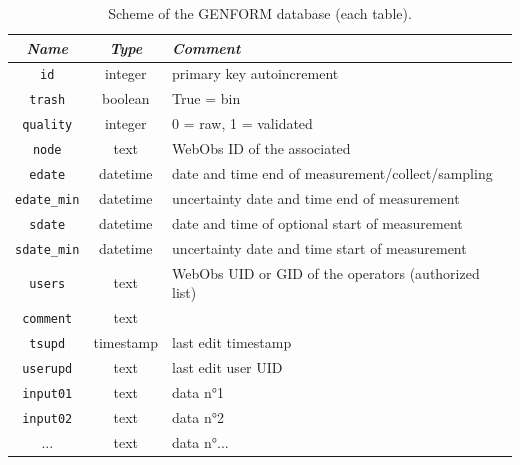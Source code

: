 \begin{table}[h]
	\centering
	\begin{tabular}{c c l}
		\hline
		\textit{Name} & \textit{Type} & \textit{Comment} \\
		\hline
		{\tt id}         & integer  & primary key autoincrement\\
		{\tt trash}      & boolean  & True = bin	\\
		{\tt quality}    & integer  & 0 = raw, 1 = validated \\
		{\tt node}       & text     & WebObs ID of the associated \wo{node} \\
		{\tt edate}      & datetime & date and time end of measurement/collect/sampling \\
		{\tt edate\_min} & datetime & uncertainty date and time end of measurement \\
		{\tt sdate}      & datetime & date and time of optional start of measurement \\
		{\tt sdate\_min} & datetime & uncertainty date and time start of measurement \\
		{\tt users}      & text     & WebObs UID or GID of the operators (authorized list) \\
		{\tt comment}    & text     & \\
		{\tt tsupd}      & timestamp & last edit timestamp \\
		{\tt userupd}    & text     & last edit user UID \\
		{\tt input01}    & text     & data n°1 \\
		{\tt input02}    & text     & data n°2 \\
		...              & text     & data n°... \\
		\hline
	\end{tabular}
	\caption{Scheme of the GENFORM database (each table).}
	\label{table:genform_db}
\end{table}

